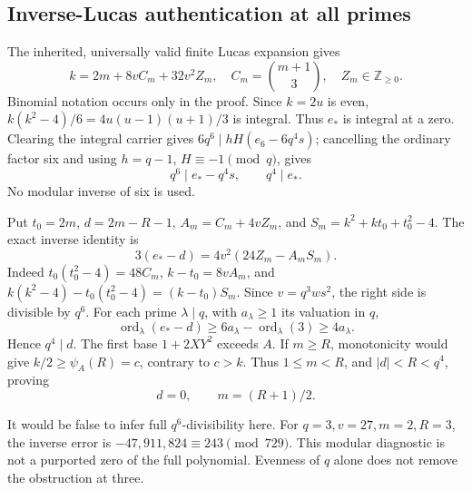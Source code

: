 \subsection{Inverse-Lucas authentication at all primes}
The inherited, universally valid finite Lucas expansion gives
\begin{equation}
 k=2m+8vC_m+32v^2Z_m,
 \quad C_m=\binom{m+1}{3},\quad Z_m\in\mathbb Z_{\ge0}.
 \label{eq:inverse-expansion}
\end{equation}
Binomial notation occurs only in the proof.  Since \(k=2u\) is even,
\(k(k^2-4)/6=4u(u-1)(u+1)/3\) is integral.  Thus \(e_*\) is
integral at a zero.  Clearing the integral carrier gives
\(6q^6\mid hH(e_6-6q^4s)\); cancelling the ordinary factor six and
using \(h=q-1\), \(H\equiv-1\pmod q\), gives
\begin{equation}
 q^6\mid e_*-q^4s,\qquad q^4\mid e_*.
 \label{eq:inverse-q4}
\end{equation}
No modular inverse of six is used.

Put \(t_0=2m\), \(d=2m-R-1\), \(A_m=C_m+4vZ_m\), and
\(S_m=k^2+kt_0+t_0^2-4\).  The exact inverse identity is
\begin{equation}
 3(e_*-d)=4v^2(24Z_m-A_mS_m).
 \label{eq:inverse-identity}
\end{equation}
Indeed \(t_0(t_0^2-4)=48C_m\), \(k-t_0=8vA_m\), and
\(k(k^2-4)-t_0(t_0^2-4)=(k-t_0)S_m\).
Since \(v=q^3ws^2\), the right side is divisible by \(q^6\).
For each prime \(\lambda\mid q\), with \(a_\lambda\ge1\) its
valuation in \(q\),
\[
 \operatorname{ord}_\lambda(e_*-d)
 \ge6a_\lambda-\operatorname{ord}_\lambda(3)\ge4a_\lambda.
\]
Hence \(q^4\mid d\).  The first base \(1+2XY^2\) exceeds \(A\).
If \(m\ge R\), monotonicity would give
\(k/2\ge\psi_A(R)=c\), contrary to \(c>k\).  Thus \(1\le m<R\),
and \(|d|<R<q^4\), proving
\begin{equation}
 d=0,\qquad m=(R+1)/2.\label{eq:inverse-index}
\end{equation}

It would be false to infer full \(q^6\)-divisibility here.
For \(q=3,v=27,m=2,R=3\), the inverse error is
\(-47{,}911{,}824\equiv243\pmod{729}\).
This modular diagnostic is not a purported zero of the full polynomial.
Evenness of \(q\) alone does not remove the obstruction at three.


